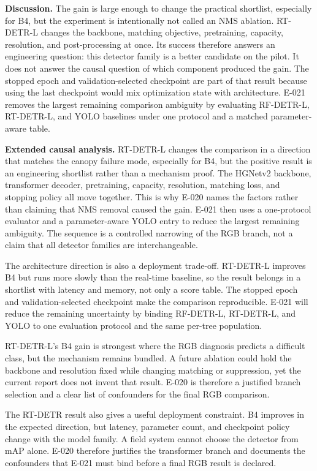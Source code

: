 \documentclass[preprint,12pt]{elsarticle}
\begin{document}
\textbf{Discussion.} The gain is large enough to change the practical
shortlist, especially for B4, but the experiment is intentionally not called
an NMS ablation. RT-DETR-L changes the backbone, matching objective,
pretraining, capacity, resolution, and post-processing at once. Its success
therefore answers an engineering question: this detector family is a better
candidate on the pilot. It does not answer the causal question of which
component produced the gain. The stopped epoch and validation-selected
checkpoint are part of that result because using the last checkpoint would
mix optimization state with architecture. E-021 removes the largest remaining
comparison ambiguity by evaluating RF-DETR-L, RT-DETR-L, and YOLO baselines
under one protocol and a matched parameter-aware table.

\textbf{Extended causal analysis.} RT-DETR-L changes the comparison in a
direction that matches the canopy failure mode, especially for B4, but the
positive result is an engineering shortlist rather than a mechanism proof.
The HGNetv2 backbone, transformer decoder, pretraining, capacity, resolution,
matching loss, and stopping policy all move together. This is why E-020 names
the factors rather than claiming that NMS removal caused the gain. E-021 then
uses a one-protocol evaluator and a parameter-aware YOLO entry to reduce the
largest remaining ambiguity. The sequence is a controlled narrowing of the
RGB branch, not a claim that all detector families are interchangeable.

The architecture direction is also a deployment trade-off. RT-DETR-L improves
B4 but runs more slowly than the real-time baseline, so the result belongs in
a shortlist with latency and memory, not only a score table. The stopped
epoch and validation-selected checkpoint make the comparison reproducible.
E-021 will reduce the remaining uncertainty by binding RF-DETR-L, RT-DETR-L,
and YOLO to one evaluation protocol and the same per-tree population.

RT-DETR-L's B4 gain is strongest where the RGB diagnosis predicts a difficult
class, but the mechanism remains bundled. A future ablation could hold the
backbone and resolution fixed while changing matching or suppression, yet the
current report does not invent that result. E-020 is therefore a justified
branch selection and a clear list of confounders for the final RGB comparison.

The RT-DETR result also gives a useful deployment constraint. B4 improves in
the expected direction, but latency, parameter count, and checkpoint policy
change with the model family. A field system cannot choose the detector from
mAP alone. E-020 therefore justifies the transformer branch and documents
the confounders that E-021 must bind before a final RGB result is declared.
\end{document}
